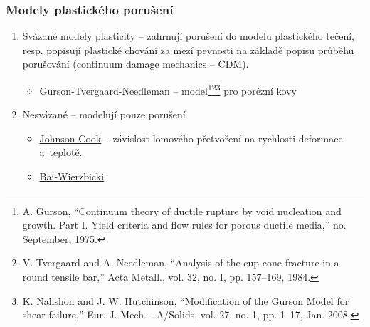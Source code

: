 \subsubsection{Modely plastického porušení}
\begin{enumerate}
	\item Svázané modely plasticity -- zahrnují porušení do modelu plastického tečení, resp. popisují plastické chování za mezí pevnosti na základě popisu průběhu porušování (continuum damage mechanics -- CDM).
	\begin{itemize}
		\item Gurson-Tvergaard-Needleman -- model\footnote{A. Gurson, “Continuum theory of ductile rupture by void nucleation and growth. Part I. Yield criteria and flow rules for porous ductile media,” no. September, 1975.}\footnote{V. Tvergaard and A. Needleman, “Analysis of the cup-cone fracture in a round tensile bar,” Acta Metall., vol. 32, no. I, pp. 157–169, 1984.}\footnote{K. Nahshon and J. W. Hutchinson, “Modification of the Gurson Model for shear failure,” Eur. J. Mech. - A/Solids, vol. 27, no. 1, pp. 1–17, Jan. 2008.} pro porézní kovy
	\end{itemize}
	\item Nesvázané -- modelují pouze porušení
	\begin{itemize}
		\item \hyperref[sec:johnson-cook-poruseni]{Johnson-Cook} -- závislost lomového přetvoření na rychlosti deformace a~teplotě.
		\item \hyperref[sec:bai-wierzbicki]{Bai-Wierzbicki}
	\end{itemize}
\end{enumerate}
